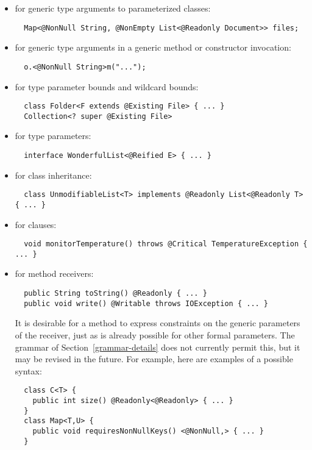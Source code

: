 \documentclass[10pt]{article}
\begin{document}
\begin{itemize}

\item for generic type arguments to parameterized classes:
\preverbnegspace
\begin{Verbatim}
  Map<@NonNull String, @NonEmpty List<@Readonly Document>> files;
\end{Verbatim}

\item for generic type arguments in a generic method or constructor invocation:
\preverbnegspace
\begin{Verbatim}
  o.<@NonNull String>m("...");
\end{Verbatim}

\item for type parameter bounds and wildcard bounds:
\preverbnegspace
\begin{Verbatim}
  class Folder<F extends @Existing File> { ... }
  Collection<? super @Existing File>
\end{Verbatim}

\item for type parameters:
\preverbnegspace
\begin{Verbatim}
  interface WonderfulList<@Reified E> { ... }
\end{Verbatim}

\item for class inheritance:
\preverbnegspace
\begin{Verbatim}
  class UnmodifiableList<T> implements @Readonly List<@Readonly T> { ... }
\end{Verbatim}

\item for  clauses:
\preverbnegspace
\begin{Verbatim}
  void monitorTemperature() throws @Critical TemperatureException { ... }
\end{Verbatim}

\item for method receivers:
\preverbnegspace
\begin{Verbatim}
  public String toString() @Readonly { ... }
  public void write() @Writable throws IOException { ... }
\end{Verbatim}

\preverbnegspace
It is desirable for a method to express constraints on the generic
parameters of the receiver, just as is already possible for other formal
parameters.
The grammar of Section~\ref{grammar-details} does not currently permit
this, but it may be revised in the future.  For example, here are examples
of a possible syntax:
\preverbnegspace
\begin{Verbatim}
  class C<T> {
    public int size() @Readonly<@Readonly> { ... }
  }
  class Map<T,U> {
    public void requiresNonNullKeys() <@NonNull,> { ... }
  }
\end{Verbatim}


\end{itemize}
\end{document}
